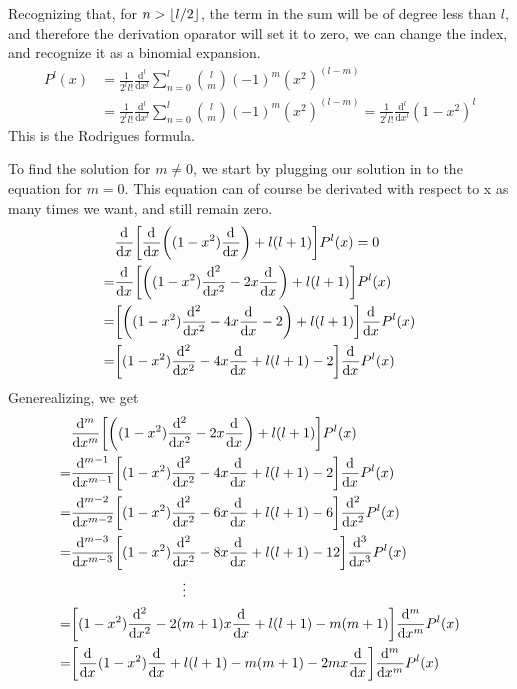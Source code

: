 \documentclass{article}
\begin{document}
    Recognizing that, for \(n > \left\lfloor l / 2 \right\rfloor\), the term in the sum will be of degree less than \(l\), and therefore the derivation oparator will set it to zero, we can change the index, and recognize it as a binomial expansion.
    \begin{align*}
        P^l(x) & = \frac{1}{2^ll!} \frac{\mathrm{d}^l}{\mathrm{d}x^l} \sum_{n = 0}^{l} \binom{l}{m}(-1)^m(x^2)^{(l - m)} \\ & = \frac{1}{2^ll!} \frac{\mathrm{d}^l}{\mathrm{d}x^l} \sum_{n = 0}^{l} \binom{l}{m}(-1)^m(x^2)^{(l - m)} = \frac{1}{2^ll!} \frac{\mathrm{d}^l}{\mathrm{d}x^l} (1 - x^2)^l
    \end{align*}
    This is the Rodrigues formula.

    To find the solution for \(m \neq 0\), we start by plugging our solution in to the equation for \(m = 0\). This equation can of course be derivated with respect to x as many times we want, and still remain zero.
    \begin{align*}
        &\d[x] \bigg[\d[x] \bigg( (1 - x^2) \d[x] \bigg)+ l(l + 1) \bigg] P^l(x) = 0 
        \\
        = & \d[x] \bigg[\bigg( (1 - x^2) \d[x]2 - 2x\d[x] \bigg)+ l(l + 1) \bigg] P^l(x) 
        \\
        = & \bigg[\bigg( (1 - x^2) \d[x]2 - 4x\d[x] - 2 \bigg)+ l(l + 1) \bigg] \d[x] P^l(x)
        \\
        = & \bigg[ (1 - x^2) \d[x]2 - 4x\d[x] + l(l + 1) - 2 \bigg] \d[x] P^l(x)
    \end{align*}
    Generealizing, we get
    \begin{align*}
        &\d[x]m \bigg[\bigg( (1 - x^2) \d[x]2 - 2x\d[x] \bigg)+ l(l + 1) \bigg] P^l(x) 
        \\
        = &\d[x]m-1  \bigg[ (1 - x^2) \d[x]2 - 4x\d[x] + l(l + 1) - 2 \bigg] \d[x] P^l(x)
        \\
        = &\d[x]m-2  \bigg[ (1 - x^2) \d[x]2 - 6x\d[x] + l(l + 1) - 6 \bigg] \d[x]2 P^l(x)
        \\
        = &\d[x]m-3  \bigg[ (1 - x^2) \d[x]2 - 8x\d[x] + l(l + 1) - 12 \bigg] \d[x]3 P^l(x)
        \\
        &\quad \quad \quad \quad \quad \quad \quad \quad \vdots
        \\
        = &\bigg[ (1 - x^2) \d[x]2 - 2(m + 1)x\d[x] + l(l + 1) - m(m + 1) \bigg] \d[x]m P^l(x)
        \\
        = &\bigg[ \d[x] (1 - x^2) \d[x] + l(l + 1) - m(m + 1) - 2mx\d[x] \bigg] \d[x]m P^l(x)    
    \end{align*}
\end{document}
